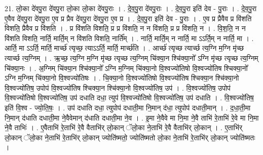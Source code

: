 \documentclass[17pt]{extarticle}
\begin{document}
21. लो॒का दे॑वपु॒रा दे॑वपु॒रा लो॒का लो॒का दे॑वपु॒राः । . दे॒व॒पु॒रा दे॑वपु॒राः । . दे॒व॒पु॒रा इति॑ देव - पु॒राः । . दे॒व॒पु॒रा ए॒वैव दे॑वपु॒रा दे॑वपु॒रा ए॒व प्र प्रैव दे॑वपु॒रा दे॑वपु॒रा ए॒व प्र । . दे॒व॒पु॒रा इति॑ देव - पु॒राः । . ए॒व प्र प्रैवैव प्र वि॑शति विशति॒ प्रैवैव प्र वि॑शति । . प्र वि॑शति विशति॒ प्र प्र वि॑शति॒ न न वि॑शति॒ प्र प्र वि॑शति॒ न । . वि॒श॒ति॒ न न वि॑शति विशति॒ नार्ति॒ मार्ति॒म् न वि॑शति विशति॒ नार्ति᳚म् । . नार्ति॒ मार्ति॒म् न नार्ति॒ मा ऽऽर्ति॒म् न नार्ति॒ मा । . आर्ति॒ मा ऽऽर्ति॒ मार्ति॒ मार्च्छ॑ त्यृच्छ॒ त्याऽऽर्ति॒ मार्ति॒ मार्च्छ॑ति । . आर्च्छ॑ त्यृच्छ त्यार्च्छ त्य॒ग्नि म॒ग्नि मृ॑च्छ त्यार्च्छ त्य॒ग्निम् । . ऋ॒च्छ॒ त्य॒ग्नि म॒ग्नि मृ॑च्छ त्यृच्छ त्य॒ग्निम् चि॑क्या॒न श्चि॑क्या॒नो᳚ ऽग्नि मृ॑च्छ त्यृच्छ त्य॒ग्निम् चि॑क्या॒नः । . अ॒ग्निम् चि॑क्या॒न श्चि॑क्या॒नो᳚ ऽग्नि म॒ग्निम् चि॑क्या॒नो वि॒श्वज्यो॑तिषो वि॒श्वज्यो॑तिष श्चिक्या॒नो᳚ ऽग्नि म॒ग्निम् चि॑क्या॒नो वि॒श्वज्यो॑तिषः । . चि॒क्या॒नो वि॒श्वज्यो॑तिषो वि॒श्वज्यो॑तिष श्चिक्या॒न श्चि॑क्या॒नो वि॒श्वज्यो॑तिष॒ उपोप॑ वि॒श्वज्यो॑तिष श्चिक्या॒न श्चि॑क्या॒नो वि॒श्वज्यो॑तिष॒ उप॑ । . वि॒श्वज्यो॑तिष॒ उपोप॑ वि॒श्वज्यो॑तिषो वि॒श्वज्यो॑तिष॒ उप॑ दधाति दधा॒ त्युप॑ वि॒श्वज्यो॑तिषो वि॒श्वज्यो॑तिष॒ उप॑ दधाति । . वि॒श्वज्यो॑तिष॒ इति॑ वि॒श्व - ज्यो॒ति॒षः॒ । . उप॑ दधाति दधा॒ त्युपोप॑ दधाती॒मा नि॒मान् द॑धा॒ त्युपोप॑ दधाती॒मान् । . द॒धा॒ती॒मा नि॒मान् द॑धाति दधाती॒मा ने॒वैवेमान् द॑धाति दधाती॒मा ने॒व । . इ॒मा ने॒वैवे मा नि॒मा ने॒वै ताभि॑ रे॒ताभि॑ रे॒वे मा नि॒मा ने॒वै ताभिः॑ । . ए॒वैताभि॑ रे॒ताभि॑ रे॒वै वैताभि॑र् लो॒कान् ॅलो॒का ने॒ताभि॑ रे॒वै वैताभि॑र् लो॒कान् । . ए॒ताभि॑र् लो॒कान् ॅलो॒का ने॒ताभि॑ रे॒ताभि॑र् लो॒कान् ज्योति॑ष्मतो॒ ज्योति॑ष्मतो लो॒का ने॒ताभि॑ रे॒ताभि॑र् लो॒कान् ज्योति॑ष्मतः । \newline
\end{document}
